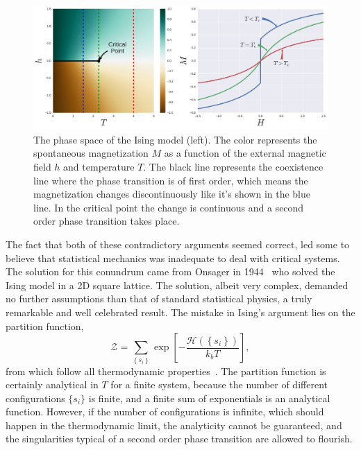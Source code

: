 \begin{figure}[t]
\begin{center}
    \includegraphics[width=\textwidth]{chapters/ch2-crit/figs/ising_phase2}
\end{center}
\caption{The phase space of the Ising model (left). The color represents the
    spontaneous magnetization $M$ as a function of the external magnetic field
    $h$ and temperature $T$. The black line represents the coexistence line
    where the phase transition is of first order, which means the magnetization
    changes discontinuously like it's shown in the blue line. In the critical
    point the change is continuous and a second order phase transition takes
    place.}
\label{fig:ising_phase2}
\end{figure}

The fact that both of these contradictory arguments seemed correct, led some to
believe that statistical mechanics was inadequate to deal with critical
systems. The solution for this conundrum came from Onsager in
1944~\cite{Onsager1944} who solved the Ising model in a 2D square lattice. The
solution, albeit very complex, demanded no further assumptions than that of
standard statistical physics, a truly remarkable and well celebrated result.
The mistake in Ising's argument lies on the partition function,
\begin{equation}
    \mathcal{Z}=
    \sum_{\left\{ s_{i}\right\} }
    \exp\left[
        -\frac{\mathcal{H}\left(\left\{ s_{i}\right\} \right)}{k_{b}T}
    \right],
\end{equation}
from which follow all thermodynamic properties~\cite{Pathria1996}. The
partition function is certainly analytical in $T$ for a finite system, because
the number of different configurations $\{s_i\}$ is finite, and a finite sum of
exponentials is an analytical function. However, if the number of
configurations is infinite, which should happen in the thermodynamic limit, the
analyticity cannot be guaranteed, and the singularities typical of a second
order phase transition are allowed to flourish.

